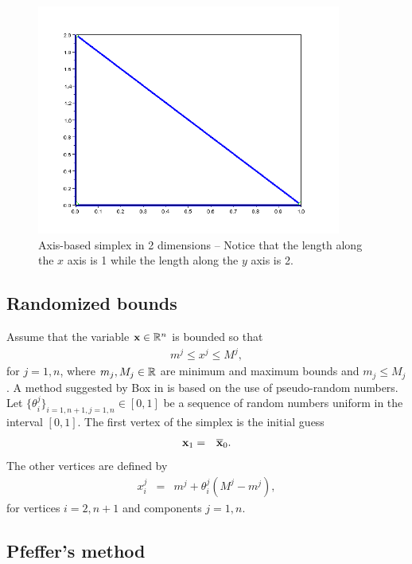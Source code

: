 \begin{figure}
\begin{center}
\includegraphics[width=10cm]{simplex_axes.png}
\end{center}
\caption{Axis-based simplex in 2 dimensions -- Notice that the length along the $x$ axis is 1 while the length
along the $y$ axis is 2. }
\label{fig-nm-simplex-axes}
\end{figure}

\subsection{Randomized bounds}

Assume that the variable $\mathbf{x}\in\mathbb{R}^n$ is bounded so that 
\begin{eqnarray}
m^j \leq x^j \leq M^j,
\end{eqnarray}
for $j=1,n$, where $m_j,M_j\in\mathbb{R}$ are minimum and maximum bounds and $m_j\leq M_j$.
A method suggested by Box in \cite{Box1965} is based on the use of 
pseudo-random numbers. Let $\{\theta_i^j\}_{i=1,n+1,j=1,n}\in[0,1]$ be 
a sequence of random numbers uniform in the interval $[0,1]$.
The first vertex of the simplex is the initial guess 
\begin{eqnarray}
\mathbf{x}_1 &=& \overline{\mathbf{x}}_0.
\end{eqnarray}
The other vertices are defined by 
\begin{eqnarray}
x_i^j &=& m^j + \theta_i^j (M^j - m^j),
\end{eqnarray}
for vertices $i=2,n+1$ and components $j=1,n$.

\subsection{Pfeffer's method}

